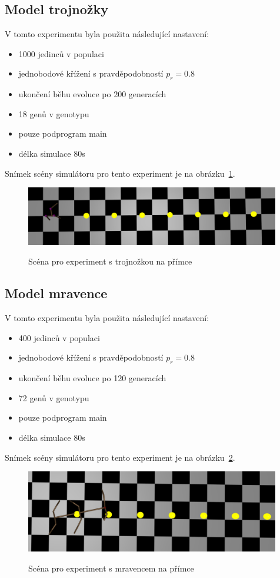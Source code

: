 \subsection{Model trojnožky}
V tomto experimentu byla použita následující nastavení:
\begin{itemize}
    \item 1000 jedinců v populaci
    \item jednobodové křížení s pravděpodobností $p_r = 0.8$
    \item ukončení běhu evoluce po 200 generacích
    \item 18 genů v genotypu
    \item pouze podprogram main
    \item délka simulace 80s
\end{itemize}

Snímek scény simulátoru pro tento experiment je na obrázku~\ref{fig:trojnozka_primka_zhora}.
\begin{figure}[h]
    \centering
    {\includegraphics[width=30em]{obrazky/trojnozka_primka_zhora.png}}
    \caption{
    Scéna pro experiment s trojnožkou na přímce
    }
    \label{fig:trojnozka_primka_zhora}
\end{figure}



\subsection{Model mravence}
V tomto experimentu byla použita následující nastavení:
\begin{itemize}
    \item 400 jedinců v populaci
    \item jednobodové křížení s pravděpodobností $p_r = 0.8$
    \item ukončení běhu evoluce po 120 generacích
    \item 72 genů v genotypu
    \item pouze podprogram main
    \item délka simulace 80s
\end{itemize}

Snímek scény simulátoru pro tento experiment je na obrázku~\ref{fig:mravenec_primka_zhora}.
\begin{figure}[h]
    \centering
    {\includegraphics[width=30em]{obrazky/mravenec_primka_zhora.png}}
    \caption{
    Scéna pro experiment s mravencem na přímce
    }
    \label{fig:mravenec_primka_zhora}
\end{figure}



